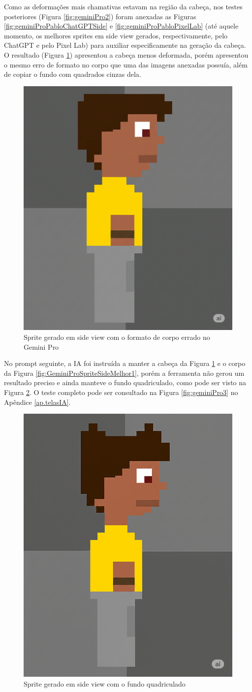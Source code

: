 \begin{figure}[htbp]
\begin{minipage}{0.45\textwidth}
    \end{minipage}
\end{figure}

Como as deformações mais chamativas estavam na região da cabeça, nos testes posteriores (Figura \ref{fig:geminiPro2}) foram anexadas as Figuras \ref{fig:geminiProPabloChatGPTSide} e \ref{fig:geminiProPabloPixelLab} (até aquele momento, os melhores sprites em side view gerados, respectivamente, pelo ChatGPT e pelo Pixel Lab) para auxiliar especificamente na geração da cabeça. O resultado (Figura \ref{fig:GeminiProSpriteCorpoErrado}) apresentou a cabeça menos deformada, porém apresentou o mesmo erro de formato no corpo que uma das imagens anexadas possuía, além de copiar o fundo com quadrados cinzas dela.

\begin{figure}[htbp]
    \centering
    \caption{\small Sprite gerado em side view com o formato de corpo errado no Gemini Pro}
    \label{fig:GeminiProSpriteCorpoErrado}
    \includegraphics[width=0.2\linewidth]{figs/geminiPro/chat1/res1_tela2.png}
\end{figure}

No prompt seguinte, a IA foi instruída a manter a cabeça da Figura \ref{fig:GeminiProSpriteCorpoErrado} e o corpo da Figura \ref{fig:GeminiProSpriteSideMelhor1}, porém a ferramenta não gerou um resultado preciso e ainda manteve o fundo quadriculado, como pode ser visto na Figura \ref{fig:GeminiProSpriteFundoCopia}. O teste completo pode ser consultado na Figura \ref{fig:geminiPro3} no Apêndice \ref{ap.telasIA}.

\begin{figure}[htbp]
    \centering
    \caption{\small Sprite gerado em side view com o fundo quadriculado}
    \label{fig:GeminiProSpriteFundoCopia}
    \includegraphics[width=0.2\linewidth]{figs/geminiPro/chat1/res1_tela3.png}
\end{figure}

